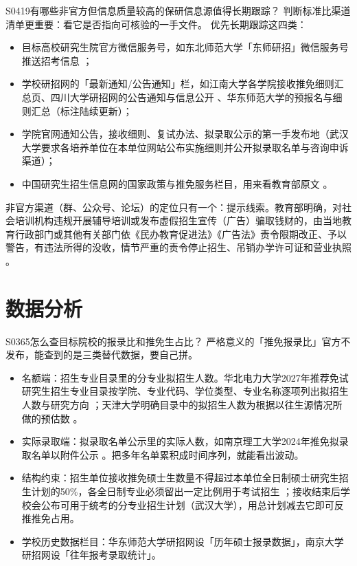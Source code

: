 \begin{qa}{S0419}{有哪些非官方但信息质量较高的保研信息源值得长期跟踪？}
判断标准比渠道清单更重要：看它是否指向可核验的一手文件。
优先长期跟踪这四类：
\begin{itemize}
  \item 目标高校研究生院官方微信服务号，如东北师范大学「东师研招」微信服务号推送招考信息 ；
  \item 学校研招网的「最新通知/公告通知」栏，如江南大学各学院接收推免细则汇总页、四川大学研招网的公告通知与信息公开 、华东师范大学的预报名与细则汇总（标注陆续更新）；
  \item 学院官网通知公告，接收细则、复试办法、拟录取公示的第一手发布地（武汉大学要求各培养单位在本单位网站公布实施细则并公开拟录取名单与咨询申诉渠道）；
  \item 中国研究生招生信息网的国家政策与推免服务栏目，用来看教育部原文 。
\end{itemize}
非官方渠道（群、公众号、论坛）的定位只有一个：提示线索。教育部明确，对社会培训机构违规开展辅导培训或发布虚假招生宣传（广告）骗取钱财的，由当地教育行政部门或其他有关部门依《民办教育促进法》《广告法》责令限期改正、予以警告，有违法所得的没收，情节严重的责令停止招生、吊销办学许可证和营业执照 。
\end{qa}

\section{数据分析}
\begin{qa}{S0365}{怎么查目标院校的报录比和推免生占比？}
严格意义的「推免报录比」官方不发布，能查到的是三类替代数据，要自己拼。
\begin{itemize}
  \item 名额端：招生专业目录里的分专业拟招生人数。华北电力大学2027年推荐免试研究生招生专业目录按学院、专业代码、学位类型、专业名称逐项列出拟招生人数与研究方向 ；天津大学明确目录中的拟招生人数为根据以往生源情况所做的预估数 。
  \item 实际录取端：拟录取名单公示里的实际人数，如南京理工大学2024年推免拟录取名单以附件公示 。把多年名单累积成时间序列，就能看出波动。
  \item 结构约束：招生单位接收推免硕士生数量不得超过本单位全日制硕士研究生招生计划的50\%，各全日制专业必须留出一定比例用于考试招生 ；接收结束后学校会公布可用于统考的分专业招生计划（武汉大学），用总计划减去它即可反推推免占用。
  \item 学校历史数据栏目：华东师范大学研招网设「历年硕士报录数据」，南京大学研招网设「往年报考录取统计」。
\end{itemize}
\end{qa}

